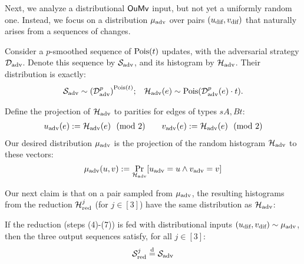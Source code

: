 \documentclass[letter,11pt]{article}
\newcommand{\oumv}{\textnormal{\textsf{OuMv}}\xspace}
\newcommand{\advdist}{\mathcal{D}_\textnormal{adv}}
\newcommand{\advseq}{{\mathcal{S}_\textnormal{adv}}}
\newcommand{\advhist}{{\mathcal{H}_\textnormal{adv}}}
\newcommand{\uadv}{u_\textnormal{adv}}
\newcommand{\vadv}{v_\textnormal{adv}}
\newcommand{\muadv}{\mu_\textnormal{adv}}
\newcommand{\redseq}{\mathcal{S}_\textnormal{red}}
\newcommand{\redhist}{\mathcal{H}_\textnormal{red}}
\newcommand{\udif}{{u_\textnormal{dif}}}
\newcommand{\vdif}{v_\textnormal{dif}}
\newcommand{\roundnumber}{{t}}
\newcommand{\samedist}{\overset{\mathrm{d}}{=}}
\begin{document}
Next, we analyze a distributional $\oumv$ input, but not yet a uniformly random one. Instead, we focus on a distribution $\muadv$ over pairs $(\udif,\vdif)$ that naturally arises from a sequences of changes. 

Consider a $p$-smoothed sequence of $\poisson{t}$ updates, with the adversarial strategy $\advdist$. Denote this sequence by $\advseq$, and its histogram by $\advhist$. Their distribution is exactly:
\[
\begin{aligned}
    \advseq \sim \left(\advdist^p\right)^{\poisson{\roundnumber}};
    && \advhist(e) \sim \poisson{\advdist^p(e) \cdot \roundnumber} .
\end{aligned}
\]

Define the projection of $\advhist$ to parities for edges of types $sA, Bt$:
\[
\begin{aligned}
    \uadv(e) := \advhist(e) \ \text{  (mod 2)}
    && &&
    \vadv(e) := \advhist(e) \ \text{  (mod 2)}
\end{aligned}
\]
Our desired distribution $\muadv$ is the projection of the random histogram $\advhist$ to these vectors:
\[
    \muadv(u,v) := \Prob{\advhist}{\uadv = u \wedge \vadv = v}
\]


Our next claim is that on a pair sampled from $\muadv$, the resulting histograms from the reduction $\redhist^j$ (for $j\in[3]$) have the same distribution as $\advhist$:

\begin{claim}
    \label{claim:distributional_input}
    If the reduction (steps (4)-(7)) is fed with distributional inputs $(\udif, \vdif)\sim \muadv$, then the three output sequences satisfy, for all $j\in[3]$:
    \[
            \redseq^j \samedist \advseq
    \]
    
\end{claim}
\end{document}
